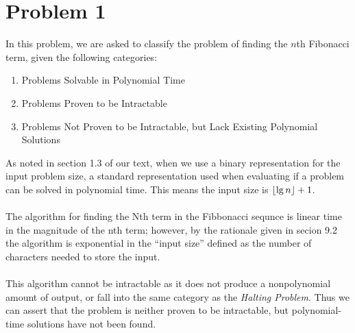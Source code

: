 \section*{Problem 1}

In this problem, we are asked to classify the problem of finding the $n$th Fibonacci term, given the following categories:
\begin{enumerate}
    \item Problems Solvable in Polynomial Time
    \item Problems Proven to be Intractable
    \item Problems Not Proven to be Intractable, but Lack Existing Polynomial Solutions
\end{enumerate}
%
As noted in section 1.3 of our text, when we use a binary representation for the input problem size, a standard representation used when evaluating if a problem can be solved in polynomial time. This means the input size is $\lfloor\lg n\rfloor + 1$.
\\
\\
The algorithm for finding the Nth term in the Fibbonacci sequnce is linear time
in the magnitude of the nth term; however, by the rationale given in secion 9.2
the algorithm is exponential in the ``input size'' defined as the number of 
characters needed to store the input.
\\
\\
This algorithm cannot be intractable as it does not produce a nonpolynomial 
amount of output, or fall into the same category as the 
\textit{Halting Problem}. Thus we can assert that the problem is neither proven
to be intractable, but polynomial-time solutions have not been found.
